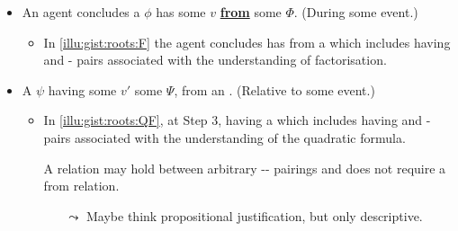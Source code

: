 \documentclass[10pt]{article}
\newcommand{\squareBullet}{\textcolor{black}{\raisebox{.45ex}{\rule{.6ex}{.6ex}}}}
\newcommand{\hand}{\ding{43}}
\begin{document}
\begin{note}
  \begin{itemize}[label = \squareBullet]
  \item
    An agent concludes a  \(\phi\) has some  \(v\) \underline{\textbf{from}} some \pool{} \(\Phi\). \hfill (During some event.)
    \begin{itemize}
    \item
      In \autoref{illu:gist:roots:F} the agent concludes \propI{\rootsCon{}} has \val{}  from a \pool{} which includes \propM{\rootsConEq{}} having   and - pairs associated with the \agents{} understanding of factorisation.
    \end{itemize}
  \item
    A  \(\psi\) having some  \(v'\) \underline{\textbf{\fof{}}} some \pool{} \(\Psi\), from an \agpe{}. \hfill (Relative to some event.)
    \begin{itemize}
    \item
      In \autoref{illu:gist:roots:QF}, at Step 3, \propI{\rootsCon{}} having \val{}  \fof{} a \pool{} which includes \propM{\rootsConEq{}} having   and - pairs associated with the \agents{} understanding of the quadratic formula.
    \end{itemize}
    \begin{itemize}
    \item[\hand]
      A \fof{} relation may hold between arbitrary -- pairings and does not require a from relation.
      \begin{itemize}
      \item[\(\leadsto\)]
        Maybe think propositional justification, but only descriptive.
      \end{itemize}
    \end{itemize}
  \end{itemize}
\end{note}

\begin{comment}
  Relative to an \eiw{} agent concludes.

  From, and \fof{}.
  Coincide.
  However, \fofr{} are more general.
  With respect to \scen{1}, two from relations, only hold relative to the \scen{0}.
  Still, the \fofr{} relation may hold in both \scen{1}.
  I.e.\ agent concluded by factorisation, but had the option to use the quadratic formula.
  For additional examples, consider practice problems.
  If you've been learning the basics of factorisation, then \fofr{} should (hopefully) hold for practice problems.
\end{comment}
\end{document}
